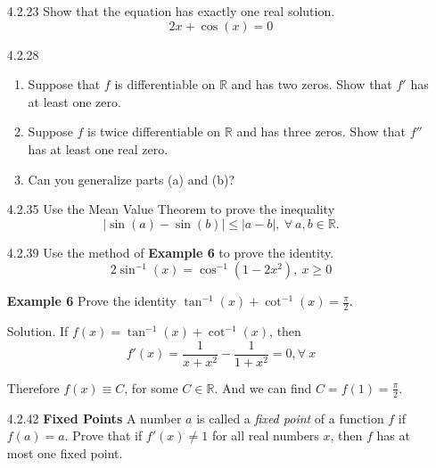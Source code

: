 \documentclass{article}
\begin{document}
\begin{enumerate}
\item[4.2.23]
    Show that the equation has exactly one real solution.
    \[
        2x + \cos (x) = 0
    \]

\vspace{5cm}

\item[4.2.28]
    \begin{enumerate}
        \item
            Suppose that $f$ is differentiable on $\mathbb{R}$ and has two zeros.
            Show that $f'$ has at least one zero.
        \item
            Suppose $f$ is twice differentiable on $\mathbb{R}$ and
            has three zeros. Show that $f''$ has at least one
            real zero.
        \item
            Can you generalize parts (a) and (b)?
    \end{enumerate}

\vspace{6cm}

\item[4.2.35]
    Use the Mean Value Theorem to prove the inequality
    \[
        | \sin (a) - \sin (b) | \leqslant | a - b |,\ \forall\ a, b \in \mathbb{R}.
    \]

\newpage

\item[4.2.39]
    Use the method of \textbf{Example 6} to prove the identity.
    \[
        2 \sin^{-1} (x) = \cos^{-1} (1 - 2x^{2}),\ x \geqslant 0
    \]

    \begin{tcolorbox}
        \textbf{Example 6} Prove the identity $ \displaystyle  \tan^{-1} (x) + \cot^{-1} (x) = \frac{\pi}{2}$.

        Solution. If $f(x) = \tan^{-1} (x) + \cot^{-1} (x)$, then
        \[
            f'(x) = \frac{1}{x+x^{2}} - \frac{1}{1+x^{2}} = 0, \forall\ x
        \]

        Therefore $f(x)  \equiv C$, for some $C \in \mathbb{R}$. And we can find $C = f(1) = \frac{\pi}{2}$.
    \end{tcolorbox}

\vspace{8cm}

\item[4.2.42]
    \textbf{Fixed Points} A number $a$ is called a \textit{fixed point}
    of a function $f$ if $f(a)=a$. Prove that if $f'(x) \neq 1$
    for all real numbers $x$, then $f$ has at most one
    fixed point.


\end{enumerate}
\end{document}
